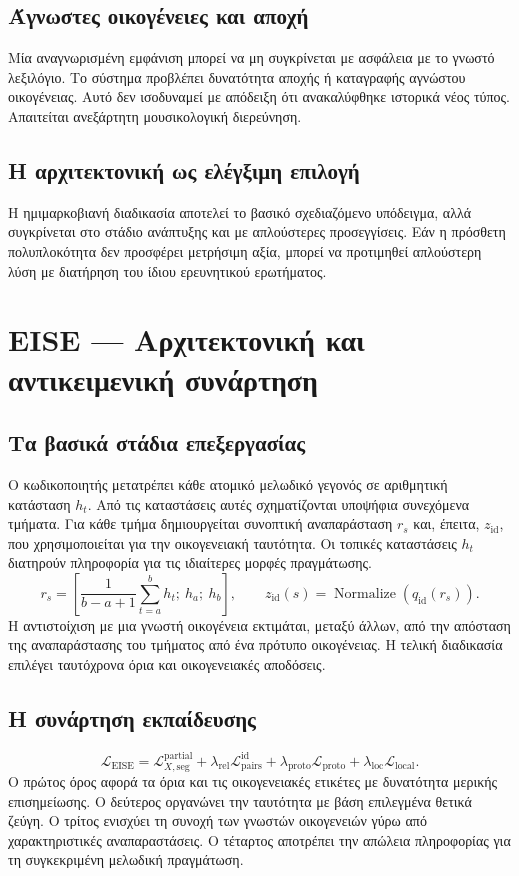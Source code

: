\documentclass[11pt,a4paper]{extarticle}
\begin{document}
\subsection*{Άγνωστες οικογένειες και αποχή}
Μία αναγνωρισμένη εμφάνιση μπορεί να μη συγκρίνεται με ασφάλεια με το γνωστό λεξιλόγιο. Το σύστημα προβλέπει δυνατότητα αποχής ή καταγραφής αγνώστου οικογένειας. Αυτό δεν ισοδυναμεί με απόδειξη ότι ανακαλύφθηκε ιστορικά νέος τύπος. Απαιτείται ανεξάρτητη μουσικολογική διερεύνηση.

\subsection*{Η αρχιτεκτονική ως ελέγξιμη επιλογή}
Η ημιμαρκοβιανή διαδικασία αποτελεί το βασικό σχεδιαζόμενο υπόδειγμα, αλλά συγκρίνεται στο στάδιο ανάπτυξης και με απλούστερες προσεγγίσεις. Εάν η πρόσθετη πολυπλοκότητα δεν προσφέρει μετρήσιμη αξία, μπορεί να προτιμηθεί απλούστερη λύση με διατήρηση του ίδιου ερευνητικού ερωτήματος.


\section{EISE — Αρχιτεκτονική και αντικειμενική συνάρτηση}
\subsection*{Τα βασικά στάδια επεξεργασίας}
Ο κωδικοποιητής μετατρέπει κάθε ατομικό μελωδικό γεγονός σε αριθμητική κατάσταση \(h_t\). Από τις καταστάσεις αυτές σχηματίζονται υποψήφια συνεχόμενα τμήματα. Για κάθε τμήμα δημιουργείται συνοπτική αναπαράσταση \(r_s\) και, έπειτα, \(z_{\mathrm{id}}\), που χρησιμοποιείται για την οικογενειακή ταυτότητα. Οι τοπικές καταστάσεις \(h_t\) διατηρούν πληροφορία για τις ιδιαίτερες μορφές πραγμάτωσης.
\[
r_s=\left[\frac{1}{b-a+1}\sum_{t=a}^{b}h_t;\ h_a;\ h_b\right],\qquad
z_{\mathrm{id}}(s)=\operatorname{Normalize}(q_{\mathrm{id}}(r_s)).
\]
Η αντιστοίχιση με μια γνωστή οικογένεια εκτιμάται, μεταξύ άλλων, από την απόσταση της αναπαράστασης του τμήματος από ένα πρότυπο οικογένειας. Η τελική διαδικασία επιλέγει ταυτόχρονα όρια και οικογενειακές αποδόσεις.

\subsection*{Η συνάρτηση εκπαίδευσης}
\[
\mathcal L_{\mathrm{EISE}}=
\mathcal L_{X,\mathrm{seg}}^{\mathrm{partial}}
+\lambda_{\mathrm{rel}}\mathcal L_{\mathrm{pairs}}^{\mathrm{id}}
+\lambda_{\mathrm{proto}}\mathcal L_{\mathrm{proto}}
+\lambda_{\mathrm{loc}}\mathcal L_{\mathrm{local}}.
\]
Ο πρώτος όρος αφορά τα όρια και τις οικογενειακές ετικέτες με δυνατότητα μερικής επισημείωσης. Ο δεύτερος οργανώνει την ταυτότητα με βάση επιλεγμένα θετικά ζεύγη. Ο τρίτος ενισχύει τη συνοχή των γνωστών οικογενειών γύρω από χαρακτηριστικές αναπαραστάσεις. Ο τέταρτος αποτρέπει την απώλεια πληροφορίας για τη συγκεκριμένη μελωδική πραγμάτωση.
\end{document}
